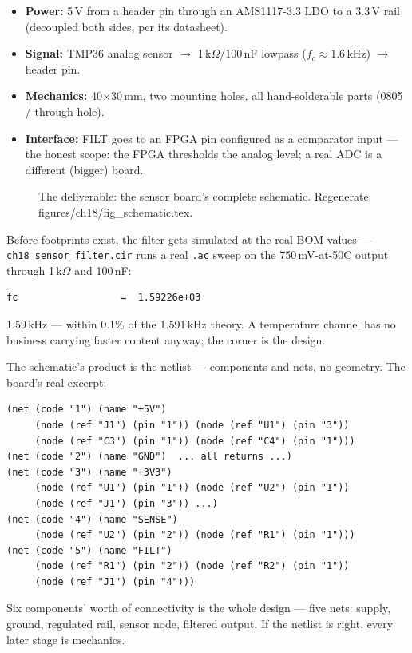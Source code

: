 \begin{itemize}
\item \textbf{Power:} 5\,V from a header pin through an AMS1117-3.3
LDO to a 3.3\,V rail (decoupled both sides, per its datasheet).
\item \textbf{Signal:} TMP36 analog sensor $\to$ 1\,k$\Omega$/100\,nF
lowpass ($f_c\approx1.6$\,kHz) $\to$ header pin.
\item \textbf{Mechanics:} 40$\times$30\,mm, two mounting holes,
all hand-solderable parts (0805 / through-hole).
\item \textbf{Interface:} FILT goes to an FPGA pin configured as a
comparator input --- the honest scope: the FPGA thresholds the analog
level; a real ADC is a different (bigger) board.
\end{itemize}

\begin{figure}[htbp]
\centering

\caption{The deliverable: the sensor board's complete schematic.
Regenerate: \ttfamily figures/ch18/fig\_schematic.tex.}
\label{fig:schematic18}
\end{figure}

\begin{example}
Before footprints exist, the filter gets simulated at the real BOM
values --- \texttt{ch18\_sensor\_filter.cir} runs a real \texttt{.ac}
sweep on the 750\,mV-at-50\textdegree C output through 1\,k$\Omega$
and 100\,nF:

\begin{lstlisting}[caption={Real ngspice output --- the filter's
measured corner matches the 1/(2$\pi$RC) prediction.}]
fc                  =  1.59226e+03
\end{lstlisting}

1.59\,kHz --- within 0.1\% of the 1.591\,kHz theory. A temperature
channel has no business carrying faster content anyway; the corner
is the design.
\end{example}

\begin{example}
The schematic's product is the netlist --- components and nets, no
geometry. The board's real excerpt:

\begin{lstlisting}[caption={\ttfamily ch18\_sensor.net excerpt ---
the five nets, verbatim.}]
(net (code "1") (name "+5V")
     (node (ref "J1") (pin "1")) (node (ref "U1") (pin "3"))
     (node (ref "C3") (pin "1")) (node (ref "C4") (pin "1")))
(net (code "2") (name "GND")  ... all returns ...)
(net (code "3") (name "+3V3")
     (node (ref "U1") (pin "1")) (node (ref "U2") (pin "1"))
     (node (ref "J1") (pin "3")) ...)
(net (code "4") (name "SENSE")
     (node (ref "U2") (pin "2")) (node (ref "R1") (pin "1")))
(net (code "5") (name "FILT")
     (node (ref "R1") (pin "2")) (node (ref "R2") (pin "1"))
     (node (ref "J1") (pin "4")))
\end{lstlisting}

Six components' worth of connectivity is the whole design --- five
nets: supply, ground, regulated rail, sensor node, filtered output.
If the netlist is right, every later stage is mechanics.
\end{example}

